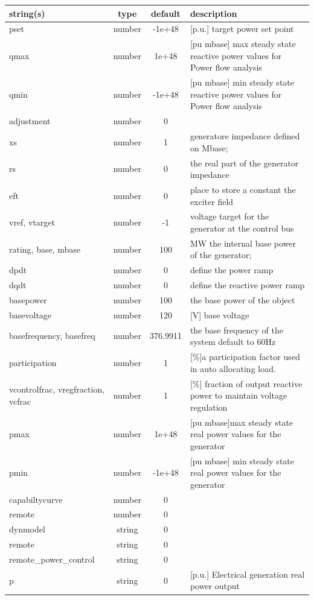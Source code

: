 \begin{longtable}{p{5cm} c c p{7cm}}
string(s) & type & default & description \\
\hline
pset & number & -1e+48 & [p.u.] target power set point\\
qmax & number & 1e+48 & [pu mbase] max steady state reactive power values for Power flow analysis\\
qmin & number & -1e+48 & [pu mbase] min steady state reactive power values for Power flow analysis\\
adjustment & number & 0 & \\
xs & number & 1 & generatore impedance defined on Mbase;\\
rs & number & 0 & the real part of the generator impedance\\
eft & number & 0 & place to store a constant the exciter field\\
vref, vtarget & number & -1 & voltage target for the generator at the control bus\\
rating, base, mbase & number & 100 & MW the internal base power of the generator;\\
dpdt & number & 0 & define the power ramp\\
dqdt & number & 0 & define the reactive power ramp\\
basepower & number & 100 & the base power of the object\\
basevoltage & number & 120 & [V] base voltage\\
basefrequency, basefreq & number & 376.9911 & the base frequency of the system default to 60Hz\\
participation & number & 1 & [\%]a participation factor used in auto allocating load.\\
vcontrolfrac, vregfraction, vcfrac & number & 1 & [\%]  fraction of output reactive power to maintain voltage regulation\\
pmax & number & 1e+48 & [pu mbase]max steady state real power values for the generator\\
pmin & number & -1e+48 & [pu mbase] min steady state real power values for the generator\\
capabiltycurve & number & 0 & \\
remote & number & 0 & \\
dynmodel & string & 0 & \\
remote & string & 0 & \\
remote\_power\_control & string & 0 & \\
p & string & 0 & [p.u.] Electrical generation real power output\\

\end{longtable}
